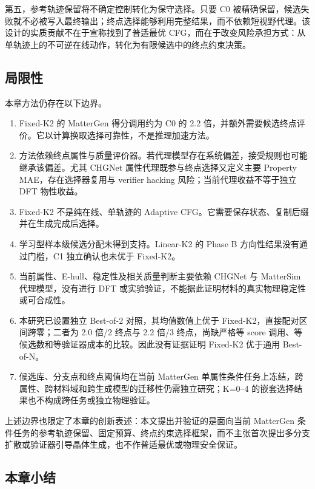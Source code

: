 第五，参考轨迹保留将不确定控制转化为保守选择。只要 C0 被精确保留，候选失败就不必被写入最终输出；终点选择能够利用完整结果，而不依赖短视野代理。该设计的实质贡献不在于宣称找到了普适最优 CFG，而在于改变风险承担方式：从单轨迹上的不可逆在线动作，转化为有限候选中的终点约束决策。

\subsection{局限性}

本章方法仍存在以下边界。

\begin{enumerate}
\def\labelenumi{\arabic{enumi}.}
\tightlist
\item
  Fixed-K2 的 MatterGen 得分调用约为 C0 的 2.2 倍，并额外需要候选终点评价。它以计算换取选择可靠性，不是推理加速方法。
\item
  方法依赖终点属性与质量评价器。若代理模型存在系统偏差，接受规则也可能继承该偏差。尤其 CHGNet 属性代理既参与终点选择又定义主要 Property MAE，存在选择器复用与 verifier hacking 风险；当前代理收益不等于独立 DFT 物性收益。
\item
  Fixed-K2 不是纯在线、单轨迹的 Adaptive CFG。它需要保存状态、复制后缀并在生成完成后选择。
\item
  学习型样本级候选分配未得到支持。Linear-K2 的 Phase B 方向性结果没有通过门槛，C1 独立确认也未优于 Fixed-K2。
\item
  当前属性、E-hull、稳定性及相关质量判断主要依赖 CHGNet 与 Matter\allowbreak Sim 代理模型，没有进行 DFT 或实验验证，不能据此证明材料的真实物理稳定性或可合成性。
\item
  本研究已设置独立 Best-of-2 对照，其均值数值上优于 Fixed-K2，直接配对区间跨零；二者为 2.0 倍/2 终点与 2.2 倍/3 终点，尚缺严格等 score 调用、等候选数和等验证器成本的比较。因此没有证据证明 Fixed-K2 优于通用 Best-of-N。
\item
  候选库、分支点和终点阈值均在当前 MatterGen 单属性条件任务上冻结，跨属性、跨材料域和跨生成模型的迁移性仍需独立研究；K=0--4 的嵌套选择结果也不构成跨任务或独立物理验证。
\end{enumerate}

上述边界也限定了本章的创新表述：本文提出并验证的是面向当前 MatterGen 条件任务的参考轨迹保留、固定预算、终点约束选择框架，而不主张首次提出多分支扩散或验证器引导晶体生成，也不作普适最优或物理安全保证。

\subsection{本章小结}

